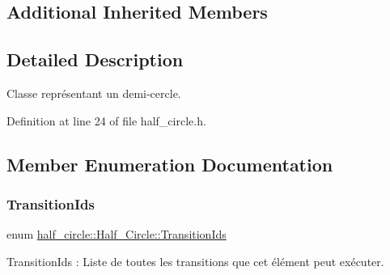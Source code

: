 \subsection*{Additional Inherited Members}


\subsection{Detailed Description}
Classe représentant un demi-\/cercle. 

Definition at line 24 of file half\+\_\+circle.\+h.



\subsection{Member Enumeration Documentation}
\mbox{\label{classhalf__circle_1_1_half___circle_a7e20290d766bda444243c1c524479304}} 
\subsubsection{\texorpdfstring{Transition\+Ids}{TransitionIds}}
{\footnotesize\ttfamily enum \hyperlink{classhalf__circle_1_1_half___circle_a7e20290d766bda444243c1c524479304}{half\+\_\+circle\+::\+Half\+\_\+\+Circle\+::\+Transition\+Ids}}



Transition\+Ids \+: Liste de toutes les transitions que cet élément peut exécuter. 

